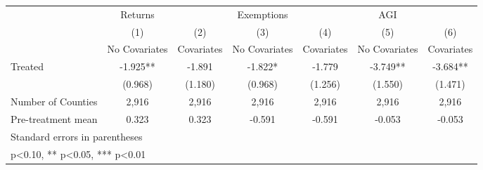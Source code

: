 {
\def\sym#1{\ifmmode^{#1}\else\(^{#1}\)\fi}
\begin{tabular}{l*{6}{c}}
\hline\hline
            &     Returns   &               &  Exemptions   &               &         AGI   &               \\
            &\multicolumn{1}{c}{(1)}&\multicolumn{1}{c}{(2)}&\multicolumn{1}{c}{(3)}&\multicolumn{1}{c}{(4)}&\multicolumn{1}{c}{(5)}&\multicolumn{1}{c}{(6)}\\
            &\multicolumn{1}{c}{No Covariates}&\multicolumn{1}{c}{Covariates}&\multicolumn{1}{c}{No Covariates}&\multicolumn{1}{c}{Covariates}&\multicolumn{1}{c}{No Covariates}&\multicolumn{1}{c}{Covariates}\\
\hline
Treated     &      -1.925** &      -1.891   &      -1.822*  &      -1.779   &      -3.749** &      -3.684** \\
            &     (0.968)   &     (1.180)   &     (0.968)   &     (1.256)   &     (1.550)   &     (1.471)   \\
\hline
Number of Counties&       2,916   &       2,916   &       2,916   &       2,916   &       2,916   &       2,916   \\
Pre-treatment mean&       0.323   &       0.323   &      -0.591   &      -0.591   &      -0.053   &      -0.053   \\
\hline\hline
\multicolumn{7}{l}{\footnotesize Standard errors in parentheses}\\
\multicolumn{7}{l}{\footnotesize * p<0.10, ** p<0.05, *** p<0.01}\\
\end{tabular}
}
